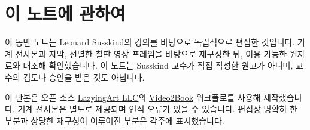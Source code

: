 \documentclass[11pt,oneside]{book}
\begin{document}
\frontmatter
\hypersetup{pageanchor=false}

\hypersetup{pageanchor=true}

\clearpage
\chapter{이 노트에 관하여}
이 동반 노트는 Leonard Susskind의 강의를 바탕으로 독립적으로 편집한 것입니다. 기계 전사본과 자막, 선별한 칠판 영상 프레임을 바탕으로 재구성한 뒤, 이용 가능한 원자료와 대조해 확인했습니다. 이 노트는 Susskind 교수가 직접 작성한 원고가 아니며, 교수의 검토나 승인을 받은 것도 아닙니다.

이 판본은 오픈 소스 \href{https://lazying.art}{LazyingArt LLC}의 \href{https://github.com/lachlanchen/Video2Book}{Video2Book} 워크플로를 사용해 제작했습니다. 기계 전사본은 별도로 제공되며 인식 오류가 있을 수 있습니다. 편집상 명확히 한 부분과 상당한 재구성이 이루어진 부분은 각주에 표시했습니다.
\clearpage
\tableofcontents
\mainmatter

\end{document}
